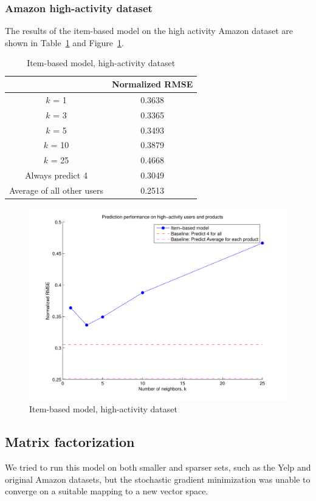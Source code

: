 \documentclass[letterpaper, 11 pt, conference]{ieeeconf}
\begin{document}
\subsubsection{Amazon high-activity dataset}
The results of the item-based model on the high activity Amazon dataset 
are shown in Table~\ref{table:modeltwo_subset} and 
Figure~\ref{fig:modeltwo_subset}.

\begin{table}[htb]
\centering
\begin{tabular}{|c|c|}
\cline{2-2}

\multicolumn{1}{c|}{}  & {Normalized RMSE} \tabularnewline \hline
$k$ = 1 & 0.3638 \tabularnewline
$k$ = 3 & 0.3365 \tabularnewline
$k$ = 5 & 0.3493 \tabularnewline
$k$ = 10 & 0.3879 \tabularnewline
$k$ = 25 & 0.4668 \tabularnewline
\hline
Always predict 4 & 0.3049 \tabularnewline 
Average of all other users & 0.2513 \tabularnewline
\hline
\end{tabular}
\caption{Item-based model, high-activity dataset}
\label{table:modeltwo_subset}
\end{table}

\begin{figure}[h]
\includegraphics[scale=0.6]{images/modeltwo_subset.pdf}
\caption{Item-based model, high-activity dataset}
\label{fig:modeltwo_subset}
\end{figure}


\subsection{Matrix factorization}
We tried to run this model on both smaller and sparser sets, such as the Yelp and 
original Amazon datasets, but the stochastic gradient minimization was unable to
converge on a suitable mapping to a new vector space.
\end{document}
